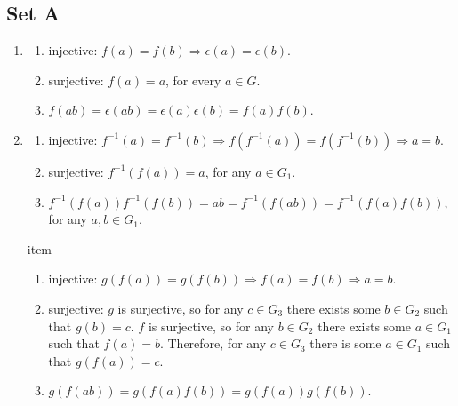 \documentclass{article}
\begin{document}
\subsection{Set A}
\begin{enumerate}
    \item
        \begin{enumerate}
            \item injective: $f(a) = f(b) \Rightarrow \epsilon(a) = \epsilon(b)$.
    
            \item surjective: $f(a) = a$, for every $a \in G$.
    
            \item $f(ab) = \epsilon(ab) = \epsilon(a)\epsilon(b) = f(a)f(b)$.
        \end{enumerate}
    
    \item
        \begin{enumerate}
            \item injective: $f^{-1}(a) = f^{-1}(b) \Rightarrow f(f^{-1}(a)) = f(f^{-1}(b)) \Rightarrow a = b$.
    
            \item surjective: $f^{-1}(f(a)) = a$, for any $a \in G_1$.
    
            \item $f^{-1}(f(a))f^{-1}(f(b)) = ab = f^{-1}(f(ab)) = f^{-1}(f(a)f(b))$, for any $a, b \in G_1$.
        \end{enumerate}
    item
        \begin{enumerate}
            \item injective: $ g(f(a)) = g(f(b)) \Rightarrow f(a) = f(b) \Rightarrow a = b $.
    
            \item surjective: $ g $ is surjective, so for any $ c \in G_3 $ there exists some $ b \in G_2 $ such that $ g(b) = c $. $ f $ is surjective, so for any $ b \in G_2 $ there exists some $ a \in G_1 $ such that $ f(a) = b $. Therefore, for any $ c \in G_3 $ there is some $ a \in G_1 $ such that $ g(f(a)) = c $.
    
            \item $ g(f(ab)) = g(f(a)f(b)) = g(f(a))g(f(b)) $.
        \end{enumerate}
\end{enumerate}
\end{document}
